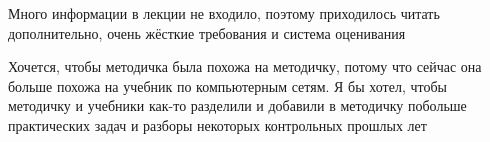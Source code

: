             \begin{commentbox} 
                Много информации в лекции не входило, поэтому приходилось читать дополнительно, очень жёсткие требования и система оценивания 
            \end{commentbox} 
        
            \begin{commentbox} 
                Хочется, чтобы методичка была похожа на методичку, потому что сейчас она больше похожа на учебник по компьютерным сетям. Я бы хотел, чтобы методичку и учебники как-то разделили и добавили в методичку побольше практических задач и разборы некоторых контрольных прошлых лет 
            \end{commentbox} 
        
            \begin{commentbox} 

\end{commentbox}

